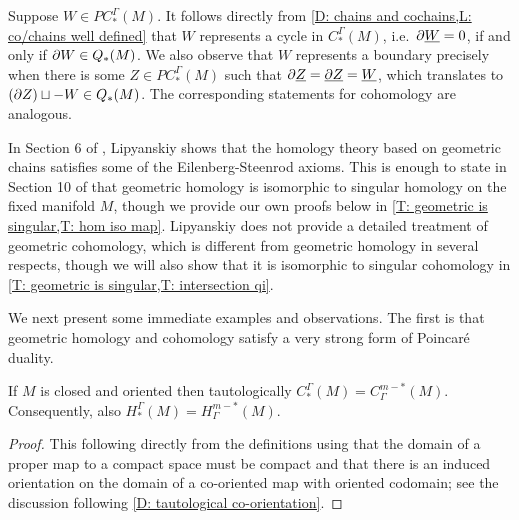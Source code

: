 \begin{remark}\label{R: cycles and boundaries}
	Suppose $W \in PC_*^{\Gamma}(M)$.
	It follows directly from \cref{D: chains and cochains,L: co/chains well defined} that $W$ represents a cycle in $C_*^{\Gamma}(M)$, i.e.\ $\partial \underline{W}=0$, if and only if $\partial W \in Q_*(M)$.
	We also observe that $W$ represents a boundary precisely when there is some $Z \in PC_*^\Gamma(M)$ such that $\partial \underline{Z} = \underline{\partial Z} = \underline{W}$, which translates to $(\partial Z) \sqcup -W \in Q_*(M)$.
	The corresponding statements for cohomology are analogous.
\end{remark}

In Section 6 of \cite{Lipy14}, Lipyanskiy shows that the homology theory based on geometric chains satisfies some of the Eilenberg-Steenrod axioms.
This is enough to state in Section 10 of \cite{Lipy14} that geometric homology is isomorphic to singular homology on the fixed manifold $M$, though we provide our own proofs below in \cref{T: geometric is singular,T: hom iso map}.
Lipyanskiy does not provide a detailed treatment of geometric cohomology, which is different from geometric homology in several respects, though we will also show that it is isomorphic to singular cohomology in \cref{T: geometric is singular,T: intersection qi}.

We next present some immediate examples and observations.
The first is that geometric homology and cohomology satisfy a very strong form of Poincar\'e duality.

\begin{theorem}\label{T: PD}
	If $M$ is closed and oriented then tautologically $C_*^\Gamma(M) = C_\Gamma^{m-*}(M)$.
	Consequently, also $H_*^\Gamma(M) = H_\Gamma^{m-*}(M)$.
\end{theorem}
\begin{proof}
	This following directly from the definitions using that the domain of a proper map to a compact space must be compact and that there is an induced orientation on the domain of a co-oriented map with oriented codomain; see the discussion following \cref{D: tautological co-orientation}.
\end{proof}



